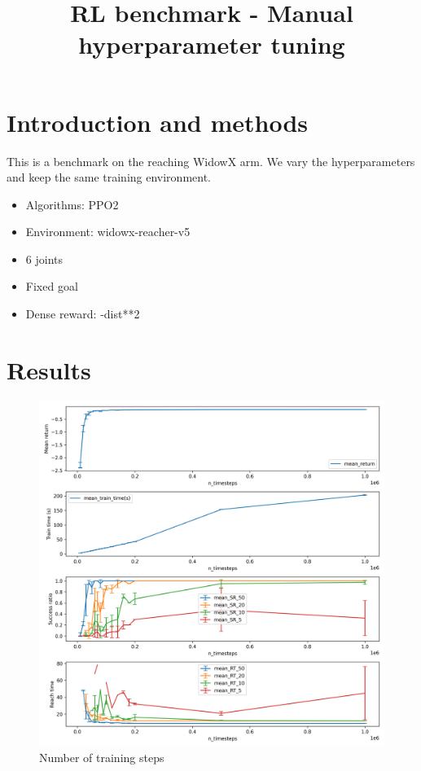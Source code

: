 \documentclass{article}
\title{RL benchmark - Manual hyperparameter tuning}
\date{}
\begin{document}
\maketitle


\section{Introduction and methods}

This is a benchmark on the reaching WidowX arm. We vary the hyperparameters and keep the same training environment.

\begin{itemize}
  \item Algorithms: PPO2
  \item Environment: widowx-reacher-v5
  \item 6 joints
  \item Fixed goal
  \item Dense reward: -dist**2
\end{itemize}



\section{Results}


\begin{figure}[H]
    \centering
    \includegraphics[width=\textwidth]{../ppo2_n_timesteps.png}
\caption{Number of training steps}
\end{figure}
\end{document}
